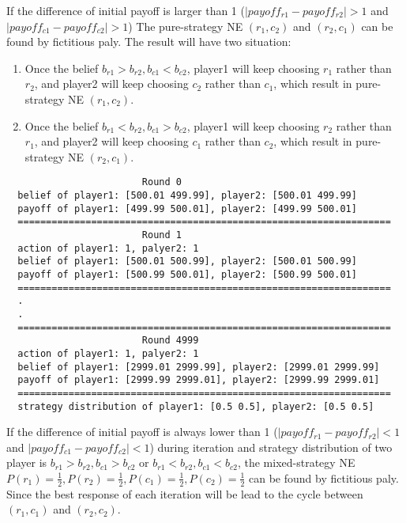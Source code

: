 \documentclass[a4paper, oneside, final, 12pt]{scrartcl} %
\begin{document}
\begingroup
\raggedright
If the difference of initial payoff is larger than 1
($|payoff_{r1} - payoff_{r2}| > 1$ and $|payoff_{c1} - payoff_{c2}| > 1$)
The pure-strategy NE $(r_1, c_2)$ and $(r_2, c_1)$ can be found by fictitious paly.
The result will have two situation:

\begin{enumerate}
  \item Once the belief $b_{r1} > b_{r2}, b_{c1} < b_{c2}$,
  player1 will keep choosing $r_1$ rather than $r_2$, 
  and player2 will keep choosing $c_2$ rather than $c_1$, 
  which result in pure-strategy NE $(r_1, c_2)$.
  \item Once the belief $b_{r1} < b_{r2}, b_{c1} > b_{c2}$,
  player1 will keep choosing $r_2$ rather than $r_1$, 
  and player2 will keep choosing $c_1$ rather than $c_2$, 
  which result in pure-strategy NE $(r_2, c_1)$.
\end{enumerate}
\endgroup

\begin{lstlisting}
                        Round 0
  belief of player1: [500.01 499.99], player2: [500.01 499.99]
  payoff of player1: [499.99 500.01], player2: [499.99 500.01]
  ==================================================================
                        Round 1
  action of player1: 1, palyer2: 1
  belief of player1: [500.01 500.99], player2: [500.01 500.99]
  payoff of player1: [500.99 500.01], player2: [500.99 500.01]
  ==================================================================
  .
  .
  ==================================================================
                        Round 4999
  action of player1: 1, palyer2: 1
  belief of player1: [2999.01 2999.99], player2: [2999.01 2999.99]
  payoff of player1: [2999.99 2999.01], player2: [2999.99 2999.01]
  ==================================================================
  strategy distribution of player1: [0.5 0.5], player2: [0.5 0.5]
\end{lstlisting}

\begingroup
\raggedright
If the difference of initial payoff is always lower than 1
($|payoff_{r1} - payoff_{r2}| < 1$ and $|payoff_{c1} - payoff_{c2}| < 1$) during iteration
and strategy distribution of two player is 
$b_{r1} > b_{r2}, b_{c1} > b_{c2}$  or  $b_{r1} < b_{r2}, b_{c1} < b_{c2}$, 
the mixed-strategy NE $P(r_1) = \frac{1}{2}, P(r_2) = \frac{1}{2}, 
P(c_1) = \frac{1}{2}, P(c_2) = \frac{1}{2}$ can be found by fictitious paly.
Since the best response of each iteration will be lead to the cycle 
between $(r_1, c_1)$ and $(r_2, c_2)$.
\endgroup
\end{document}
